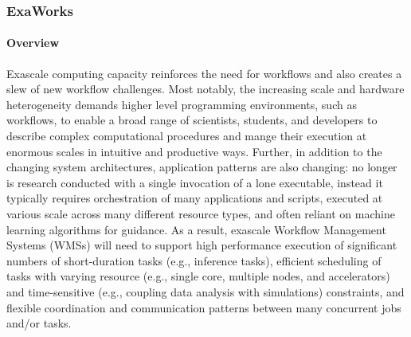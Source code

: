 
\subsubsection{ ExaWorks} \label{subsubsect:exaworks}


\paragraph{Overview} Exascale computing capacity reinforces the need for workflows and also creates
a slew of new workflow challenges. Most notably, the increasing scale and
hardware heterogeneity demands higher level programming environments, such as
workflows, to enable a broad range of scientists, students, and developers to
describe complex computational procedures and mange their execution at
enormous scales in intuitive and productive ways. Further, in addition to the
changing system architectures, application patterns are also changing: no
longer is research conducted with a single invocation of a lone executable,
instead it typically requires orchestration of many applications and scripts,
executed at various scale across many different resource types, and often
reliant on machine learning algorithms for guidance. As a result, exascale
Workflow Management Systems (WMSs) will need to support high performance
execution of significant numbers of short-duration tasks (e.g., inference
tasks), efficient scheduling of tasks with varying resource (e.g., single
core, multiple nodes, and accelerators) and time-sensitive (e.g., coupling
data analysis with simulations) constraints, and flexible coordination and
communication patterns between many concurrent jobs and/or tasks.



